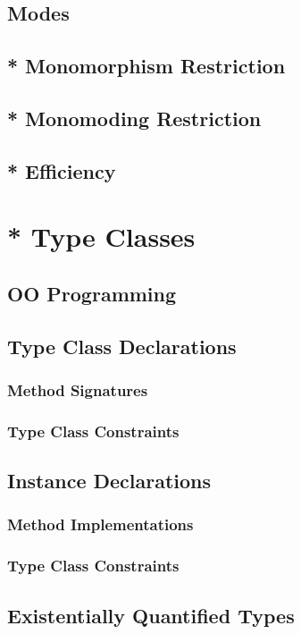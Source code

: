 \documentclass[a4paper,11pt,notitlepage,onecolumn]{article}
\begin{document}
\subsection{Modes}
\subsection{* Monomorphism Restriction}
\subsection{* Monomoding Restriction}
\subsection{* Efficiency}



\section{* Type Classes}
\subsection{OO Programming}
\subsection{Type Class Declarations}
\subsubsection{Method Signatures}
\subsubsection{Type Class Constraints}
\subsection{Instance Declarations}
\subsubsection{Method Implementations}
\subsubsection{Type Class Constraints}
\subsection{Existentially Quantified Types}
\end{document}
